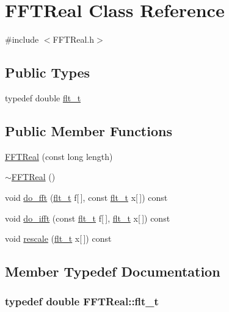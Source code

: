 \hypertarget{classFFTReal}{\section{F\-F\-T\-Real Class Reference}
\label{classFFTReal}
}


{\ttfamily \#include $<$F\-F\-T\-Real.\-h$>$}

\subsection*{Public Types}
\begin{DoxyCompactItemize}
\item 
typedef double \hyperlink{classFFTReal_ad9963e87c98cfa8a55544cd162e3fece}{flt\-\_\-t}
\end{DoxyCompactItemize}
\subsection*{Public Member Functions}
\begin{DoxyCompactItemize}
\item 
\hyperlink{classFFTReal_ac98f9b768dc122c212b6f6e4ce878e18}{F\-F\-T\-Real} (const long length)
\item 
\hyperlink{classFFTReal_a28ef7dceefba4ab73b3fecdb68a56334}{$\sim$\-F\-F\-T\-Real} ()
\item 
void \hyperlink{classFFTReal_aaef06fd9a9f9e070c5a64b8c4191c1b7}{do\-\_\-fft} (\hyperlink{classFFTReal_ad9963e87c98cfa8a55544cd162e3fece}{flt\-\_\-t} f\mbox{[}$\,$\mbox{]}, const \hyperlink{classFFTReal_ad9963e87c98cfa8a55544cd162e3fece}{flt\-\_\-t} x\mbox{[}$\,$\mbox{]}) const 
\item 
void \hyperlink{classFFTReal_a8a09a4f467150be6714a2895654e9c83}{do\-\_\-ifft} (const \hyperlink{classFFTReal_ad9963e87c98cfa8a55544cd162e3fece}{flt\-\_\-t} f\mbox{[}$\,$\mbox{]}, \hyperlink{classFFTReal_ad9963e87c98cfa8a55544cd162e3fece}{flt\-\_\-t} x\mbox{[}$\,$\mbox{]}) const 
\item 
void \hyperlink{classFFTReal_abf221c16cff2a4787765f4258c567a3a}{rescale} (\hyperlink{classFFTReal_ad9963e87c98cfa8a55544cd162e3fece}{flt\-\_\-t} x\mbox{[}$\,$\mbox{]}) const 
\end{DoxyCompactItemize}


\subsection{Member Typedef Documentation}
\hypertarget{classFFTReal_ad9963e87c98cfa8a55544cd162e3fece}{
\subsubsection[{flt\-\_\-t}]{\setlength{\rightskip}{0pt plus 5cm}typedef double {\bf F\-F\-T\-Real\-::flt\-\_\-t}}}\label{classFFTReal_ad9963e87c98cfa8a55544cd162e3fece}


